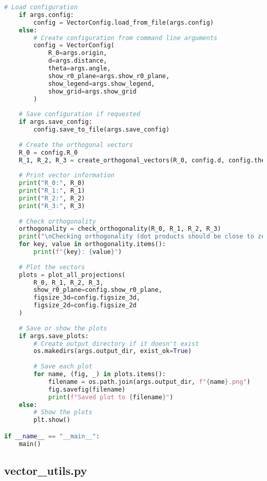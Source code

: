 \begin{lstlisting}[language=Python]
    # Load configuration
    if args.config:
        config = VectorConfig.load_from_file(args.config)
    else:
        # Create configuration from command line arguments
        config = VectorConfig(
            R_0=args.origin,
            d=args.distance,
            theta=args.angle,
            show_r0_plane=args.show_r0_plane,
            show_legend=args.show_legend,
            show_grid=args.show_grid
        )
    
    # Save configuration if requested
    if args.save_config:
        config.save_to_file(args.save_config)
    
    # Create the orthogonal vectors
    R_0 = config.R_0
    R_1, R_2, R_3 = create_orthogonal_vectors(R_0, config.d, config.theta)
    
    # Print vector information
    print("R_0:", R_0)
    print("R_1:", R_1)
    print("R_2:", R_2)
    print("R_3:", R_3)
    
    # Check orthogonality
    orthogonality = check_orthogonality(R_0, R_1, R_2, R_3)
    print("\nChecking orthogonality (dot products should be close to zero):")
    for key, value in orthogonality.items():
        print(f"{key}: {value}")
    
    # Plot the vectors
    plots = plot_all_projections(
        R_0, R_1, R_2, R_3,
        show_r0_plane=config.show_r0_plane,
        figsize_3d=config.figsize_3d,
        figsize_2d=config.figsize_2d
    )
    
    # Save or show the plots
    if args.save_plots:
        # Create output directory if it doesn't exist
        os.makedirs(args.output_dir, exist_ok=True)
        
        # Save each plot
        for name, (fig, _) in plots.items():
            filename = os.path.join(args.output_dir, f"{name}.png")
            fig.savefig(filename)
            print(f"Saved plot to {filename}")
    else:
        # Show the plots
        plt.show()

if __name__ == "__main__":
    main()
\end{lstlisting}

\subsection{vector\_utils.py}


